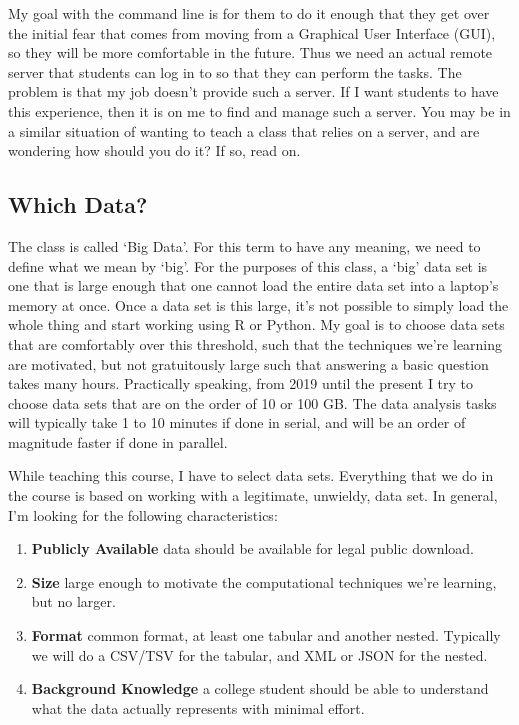 \documentclass[12pt]{article}
\begin{document}
My goal with the command line is for them to do it enough that they get over the initial fear that comes from moving from a Graphical User Interface (GUI), so they will be more comfortable in the future.
Thus we need an actual remote server that students can log in to so that they can perform the tasks.
The problem is that my job doesn't provide such a server.
If I want students to have this experience, then it is on me to find and manage such a server.
You may be in a similar situation of wanting to teach a class that relies on a server, and are wondering how should you do it?
If so, read on.

\subsection{Which Data?}

The class is called `Big Data'.
For this term to have any meaning, we need to define what we mean by `big'.
For the purposes of this class, a `big' data set is one that is large enough that one cannot load the entire data set into a laptop's memory at once.
Once a data set is this large, it's not possible to simply load the whole thing and start working using R or Python.
My goal is to choose data sets that are comfortably over this threshold, such that the techniques we're learning are motivated, but not gratuitously large such that answering a basic question takes many hours.
Practically speaking, from 2019 until the present I try to choose data sets that are on the order of 10 or 100 GB.
The data analysis tasks will typically take 1 to 10 minutes if done in serial, and will be an order of magnitude faster if done in parallel.

While teaching this course, I have to select data sets.
Everything that we do in the course is based on working with a legitimate, unwieldy, data set.
In general, I'm looking for the following characteristics:
\begin{enumerate}
\item \textbf{Publicly Available} data should be available for legal public download.
\item \textbf{Size} large enough to motivate the computational techniques we're learning, but no larger.
\item \textbf{Format} common format, at least one tabular and another nested. Typically we will do a CSV/TSV for the tabular, and XML or JSON for the nested.
\item \textbf{Background Knowledge} a college student should be able to understand what the data actually represents with minimal effort.
\end{enumerate}
\end{document}
